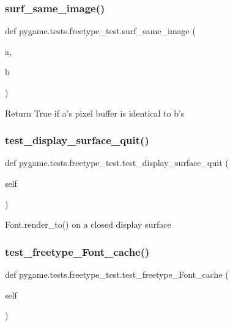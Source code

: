 \subsubsection{\texorpdfstring{surf\+\_\+same\+\_\+image()}{surf\_same\_image()}}
{\footnotesize\ttfamily def pygame.\+tests.\+freetype\+\_\+test.\+surf\+\_\+same\+\_\+image (\begin{DoxyParamCaption}\item[{}]{a,  }\item[{}]{b }\end{DoxyParamCaption})}

\begin{DoxyVerb}Return True if a's pixel buffer is identical to b's\end{DoxyVerb}
 \mbox{\label{namespacepygame_1_1tests_1_1freetype__test_a30ef75f0bd27857d022b626b2a5d82ab}} 
\subsubsection{\texorpdfstring{test\+\_\+display\+\_\+surface\+\_\+quit()}{test\_display\_surface\_quit()}}
{\footnotesize\ttfamily def pygame.\+tests.\+freetype\+\_\+test.\+test\+\_\+display\+\_\+surface\+\_\+quit (\begin{DoxyParamCaption}\item[{}]{self }\end{DoxyParamCaption})}

\begin{DoxyVerb}Font.render_to() on a closed display surface\end{DoxyVerb}
 \mbox{\label{namespacepygame_1_1tests_1_1freetype__test_af01689a7d8da9ca7db5a5dc06e101009}} 
\subsubsection{\texorpdfstring{test\+\_\+freetype\+\_\+\+Font\+\_\+cache()}{test\_freetype\_Font\_cache()}}
{\footnotesize\ttfamily def pygame.\+tests.\+freetype\+\_\+test.\+test\+\_\+freetype\+\_\+\+Font\+\_\+cache (\begin{DoxyParamCaption}\item[{}]{self }\end{DoxyParamCaption})}

